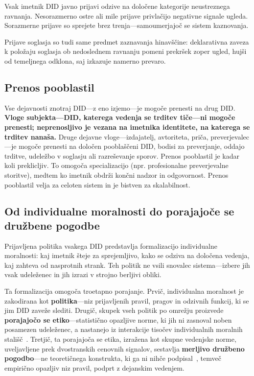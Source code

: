 \documentclass[11pt,a4paper,twocolumn]{article}
\begin{document}
Vsak imetnik DID javno prijavi odzive na določene kategorije neustreznega ravnanja. Nesorazmerno ostre ali mile prijave privlačijo negativne signale ugleda. Sorazmerne prijave so sprejete brez trenja---samoumerjajoč se sistem kaznovanja.

Prijave soglasja so tudi same predmet zaznavanja hinavščine: deklarativna zaveza k položaju soglasja ob nedoslednem ravnanju pomeni prekršek zoper ugled, hujši od temeljnega odklona, saj izkazuje namerno prevaro.

\subsection{Prenos pooblastil}

Vse dejavnosti znotraj DID---z eno izjemo---je mogoče prenesti na drug DID. \textbf{Vloge subjekta---DID, katerega vedenja se trditev tiče---ni mogoče prenesti; neprenosljivo je vezana na imetnika identitete, na katerega se trditev nanaša.} Druge dejavne vloge---izdajatelj, avtoriteta, priča, preverjevalec---je mogoče prenesti na določen pooblaščeni DID, bodisi za preverjanje, oddajo trditve, udeležbo v soglasju ali razreševanje sporov. Prenos pooblastil je kadar koli preklicljiv. To omogoča specializacijo (npr. profesionalne preverjevalne storitve), medtem ko imetnik obdrži končni nadzor in odgovornost. Prenos pooblastil velja za celoten sistem in je bistven za skalabilnost.

\subsection{Od individualne moralnosti do porajajoče se družbene pogodbe}

Prijavljena politika vsakega DID predstavlja formalizacijo individualne moralnosti: kaj imetnik šteje za sprejemljivo, kako se odziva na določena vedenja, kaj zahteva od nasprotnih strank. Teh politik ne vsili snovalec sistema---izbere jih vsak udeleženec in jih izrazi v strojno berljivi obliki.

Ta formalizacija omogoča troetapno porajanje. Prvič, individualna moralnost je zakodirana kot \textbf{politika}---niz prijavljenih pravil, pragov in odzivnih funkcij, ki se jim DID zaveže slediti. Drugič, skupek vseh politik po omrežju proizvede \textbf{porajajočo se etiko}---statistično opazljive norme, ki jih ni zasnoval noben posamezen udeleženec, a nastanejo iz interakcije tisočev individualnih moralnih stališč~\cite{durkheim1893}. Tretjič, ta porajajoča se etika, izražena kot skupne vedenjske norme, uveljavljene prek dvostranskih cenovnih signalov, sestavlja \textbf{merljivo družbeno pogodbo}---ne teoretičnega konstrukta, ki ga ni nihče podpisal~\cite{rawls1971}, temveč empirično opazljiv niz pravil, podprt z dejanskim vedenjem.
\end{document}
